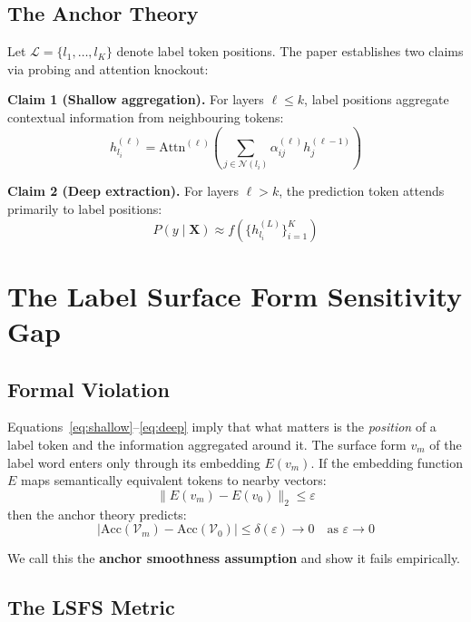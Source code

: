 \documentclass[11pt,a4paper]{article}
\begin{document}
\subsection{The Anchor Theory \citep{wang2023label}}

Let $\mathcal{L} = \{l_1, \ldots, l_K\}$ denote label token
positions. The paper establishes two claims via probing and
attention knockout:

\textbf{Claim 1 (Shallow aggregation).} For layers
$\ell \leq k$, label positions aggregate contextual
information from neighbouring tokens:
\begin{equation}
h_{l_i}^{(\ell)} = \mathrm{Attn}^{(\ell)}\!\left(
  \sum_{j \in \mathcal{N}(l_i)} \alpha_{ij}^{(\ell)}
  h_j^{(\ell-1)}
\right)
\label{eq:shallow}
\end{equation}

\textbf{Claim 2 (Deep extraction).} For layers $\ell > k$,
the prediction token attends primarily to label positions:
\begin{equation}
P(y \mid \mathbf{X}) \approx
f\!\left(\{h_{l_i}^{(L)}\}_{i=1}^{K}\right)
\label{eq:deep}
\end{equation}

\section{The Label Surface Form Sensitivity Gap}

\subsection{Formal Violation}

Equations~\eqref{eq:shallow}--\eqref{eq:deep} imply that
what matters is the \emph{position} of a label token and
the information aggregated around it. The surface form
$v_m$ of the label word enters only through its embedding
$E(v_m)$. If the embedding function $E$ maps semantically
equivalent tokens to nearby vectors:
$$\|E(v_m) - E(v_0)\|_2 \leq \varepsilon$$
then the anchor theory predicts:
$$|\mathrm{Acc}(\mathcal{V}_m) - \mathrm{Acc}(\mathcal{V}_0)|
\leq \delta(\varepsilon) \to 0
\quad \text{as } \varepsilon \to 0$$

We call this the \textbf{anchor smoothness assumption} and
show it fails empirically.

\subsection{The LSFS Metric}
\end{document}
